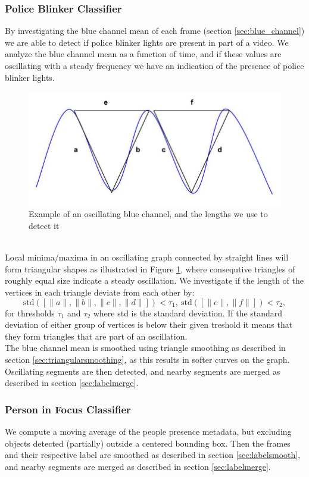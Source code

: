\subsubsection{Police Blinker Classifier}\label{sec:police_detection}
%
By investigating the blue channel mean of each frame (section \ref{sec:blue_channel}) we are able to detect if police blinker lights are present in part of a video.
We analyze the blue channel mean as a function of time, and if these values are oscillating with a steady frequency we have an indication of the presence of police blinker lights.
%
\begin{figure}[!ht]
     \centering
     \includegraphics[width=1.05\textwidth]{img/triangles.jpg}
     \caption{Example of an oscillating blue channel, and the lengths we use to detect it}\label{fig:triangles}
\end{figure}\\
%
Local minima/maxima in an oscillating graph connected by straight lines will form triangular shapes as illustrated in Figure \ref{fig:triangles}, where consequtive triangles of roughly equal size indicate a steady oscillation. We investigate if the length of the vertices in each triangle deviate from each other by:
%
\[
\text{std}([\|a\|,\|b\|,\|c\|,\|d\|]) < \tau_1,~\text{std}([\|e\|,\|f\|]) < \tau_2,
\]
%
for thresholds $\tau_1$ and $\tau_2$ where std is the standard deviation. If the standard deviation of either group of vertices is below their given treshold it means that they form triangles that are part of an oscillation.\\
The blue channel mean is smoothed using triangle smoothing as described in section \ref{sec:triangularsmoothing}, as this results in softer curves on the graph. Oscillating segments are then detected, and nearby segments are merged as described in section \ref{sec:labelmerge}.
%
\subsubsection{Person in Focus Classifier}\label{sec:infocus}
%
We compute a moving average of the people presence metadata, but excluding objects detected (partially) outside a centered bounding box. Then the frames and their respective label are smoothed as described in section \ref{sec:labelsmooth}, and nearby segments are merged as described in section \ref{sec:labelmerge}. 
%

